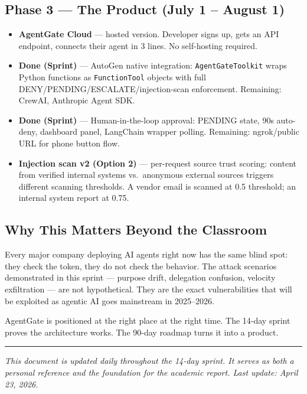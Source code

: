 \documentclass[12pt, a4paper]{article}
\begin{document}
\subsection{Phase 3 — The Product (July 1 -- August 1)}

\begin{itemize}[noitemsep]
  \item \textbf{AgentGate Cloud} — hosted version. Developer signs up, gets an API endpoint, connects their agent in 3 lines. No self-hosting required.
  \item \textcolor{permitgreen}{\textbf{Done (Sprint)}} — AutoGen native integration: \texttt{AgentGateToolkit} wraps Python functions as \texttt{FunctionTool} objects with full DENY/PENDING/ESCALATE/injection-scan enforcement. Remaining: CrewAI, Anthropic Agent SDK.
  \item \textcolor{permitgreen}{\textbf{Done (Sprint)}} — Human-in-the-loop approval: PENDING state, 90s auto-deny, dashboard panel, LangChain wrapper polling. Remaining: ngrok/public URL for phone button flow.
  \item \textbf{Injection scan v2 (Option 2)} — per-request source trust scoring: content from verified internal systems vs.\ anonymous external sources triggers different scanning thresholds. A vendor email is scanned at 0.5 threshold; an internal system report at 0.75.
\end{itemize}

\subsection{Why This Matters Beyond the Classroom}

Every major company deploying AI agents right now has the same blind spot:
they check the token, they do not check the behavior. The attack scenarios
demonstrated in this sprint — purpose drift, delegation confusion,
velocity exfiltration — are not hypothetical. They are the exact vulnerabilities
that will be exploited as agentic AI goes mainstream in 2025--2026.

AgentGate is positioned at the right place at the right time. The 14-day sprint
proves the architecture works. The 90-day roadmap turns it into a product.

\vspace{1cm}
\hrule
\vspace{0.3cm}
{\small \textit{This document is updated daily throughout the 14-day sprint.
It serves as both a personal reference and the foundation for the academic report.
Last update: April 23, 2026.}}
\end{document}
